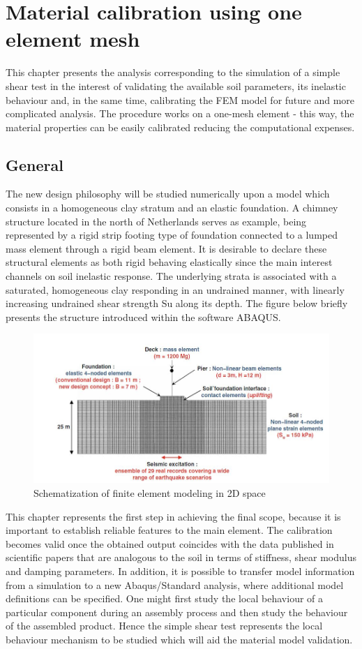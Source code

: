 \documentclass[12pt,a4paper]{report}
\begin{document}
\chapter{Material calibration using one element mesh}\label{ch3}
This chapter presents the analysis corresponding to the simulation of a simple shear test in the interest of validating the available soil parameters, its inelastic behaviour and, in the same time, calibrating the FEM model for future and more complicated analysis. The procedure works on a one-mesh element - this way, the material properties can be easily calibrated reducing the computational expenses. 

\section{General}
The new design philosophy will be studied numerically upon a model which consists in a homogeneous clay stratum and an elastic foundation.  A chimney structure located in the north of Netherlands serves as example, being represented by a rigid strip footing type of foundation connected to a lumped mass element through a rigid beam element. It is desirable to declare these structural elements as both rigid behaving elastically since the main interest channels on soil inelastic response. The underlying strata is associated with a saturated, homogeneous clay responding in an undrained manner, with linearly increasing undrained shear strength Su along its depth. The figure below briefly presents the structure introduced within the software ABAQUS.

\begin{figure}[h!]
	\centering
	\includegraphics[width=0.8\linewidth]{"scheme2D"}
	\caption{Schematization of finite element modeling in 2D space}
	\label{FEM2d}
\end{figure}

This chapter represents the first step in achieving the final scope, because it is important to establish reliable features to the main element. The calibration becomes valid once the obtained output coincides with the data published in scientific papers that are analogous to the soil in terms of stiffness, shear modulus and damping parameters. In addition, it is possible to transfer model information from a simulation to a new Abaqus/Standard analysis, where additional model definitions can be specified. One might first study the local behaviour of a particular component during an assembly process and then study the behaviour of the assembled product. Hence the simple shear test represents the local behaviour mechanism to be studied which will aid the material model validation. 
\end{document}
